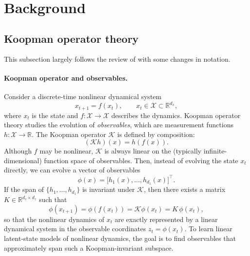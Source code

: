 \section{Background}
\label{appendix:background}

\subsection{Koopman operator theory}
\label{appendix:koopman-background}

This subsection largely follows the review of \citet{brunton_modern_2022} with some changes in notation. 

\paragraph{Koopman operator and observables.}
Consider a discrete-time nonlinear dynamical system
\begin{equation}
x_{t+1} = f(x_t), \qquad x_t \in \mathcal{X} \subset \mathbb{R}^{d_x},
\end{equation}
where $x_t$ is the state and $f : \mathcal{X} \to \mathcal{X}$ describes the dynamics.
Koopman operator theory studies the evolution of \emph{observables}, which are measurement functions $h : \mathcal{X} \to \mathbb{R}$.
The Koopman operator $\mathcal{K}$ is defined by composition:
\begin{equation}
(\mathcal{K}h)(x) = h(f(x)).
\end{equation}
Although $f$ may be nonlinear, $\mathcal{K}$ is always linear on the (typically infinite-dimensional) function space of observables. Then, instead of evolving the state $x_t$ directly, we can evolve a vector of observables
\begin{equation}
\phi(x) = \big[h_1(x), \dots, h_{d_z}(x)\big]^\top.
\end{equation}
If the span of $\{h_1,\dots,h_{d_z}\}$ is invariant under $\mathcal{K}$, 
then there exists a matrix
$K \in \mathbb{R}^{d_z \times d_z}$ such that
\begin{equation}
\phi(x_{t+1}) = \phi(f(x_t)) = \mathcal{K}\phi(x_t) = K\, \phi(x_t),
\end{equation}
so that the nonlinear dynamics of $x_t$ are exactly represented by a linear dynamical system
in the observable coordinates $z_t = \phi(x_t)$.
To learn linear latent-state models of nonlinear dynamics, the goal is to find observables that approximately span such a Koopman-invariant subspace.

